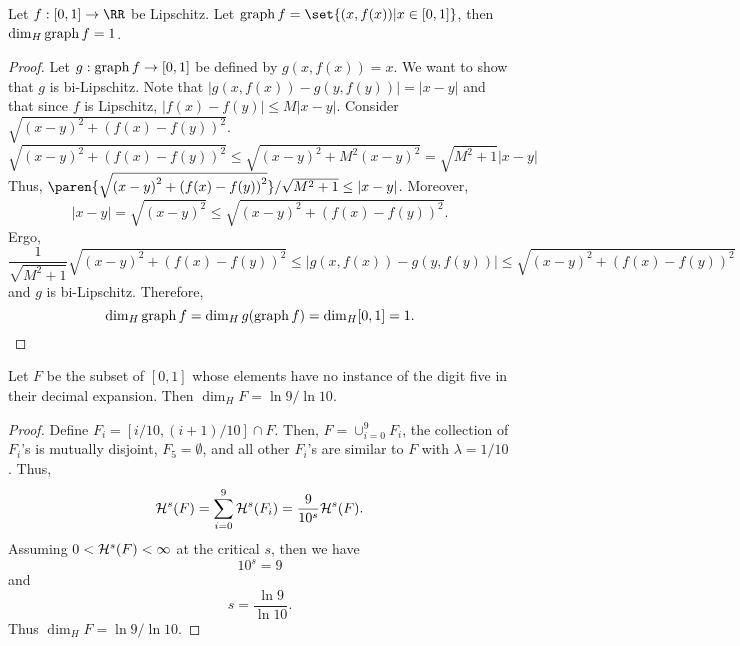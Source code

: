 \begin{example}
	Let $f:[0,1]\rightarrow\RR$ be Lipschitz.
	Let $\gra f=\set{(x,f(x))|x\in[0,1]}$, then $\operatorname{dim}_H \operatorname{graph} f =1$.
\end{example}
\begin{proof}
	Let $g:\operatorname{graph} f\rightarrow [0,1]$ be defined by $g(x,f(x))=x$.
	We want to show that $g$ is bi-Lipschitz.
	Note that $|g(x,f(x))-g(y,f(y))|=|x-y|$ and that since $f$ is Lipschitz, $|f(x)-f(y)|\leq M|x-y|$.
	Consider $\sqrt{{(x-y)}^2+{(f(x)-f(y))}^2}$.
	\[
		\sqrt{{(x-y)}^2+{(f(x)-f(y))}^2}
		\leq \sqrt{{(x-y)}^2+M^2{(x-y)}^2}
		=\sqrt{M^2+1}|x-y|
	\]
	Thus, $\paren{\sqrt{{(x-y)}^2+{(f(x)-f(y))}^2}}/\sqrt{M^2+1}\leq|x-y|$.
	Moreover,
	\[
		|x-y|=\sqrt{{(x-y)}^2}\leq\sqrt{{(x-y)}^2+{(f(x)-f(y))}^2}.
	\]
	Ergo,
	\[
		\frac{1}{\sqrt{M^2+1}}\sqrt{{(x-y)}^2+{(f(x)-f(y))}^2}
		\leq |g(x,f(x))-g(y,f(y))|
		\leq \sqrt{{(x-y)}^2+{(f(x)-f(y))}^2}
	\]
	and $g$ is bi-Lipschitz.
	Therefore,
	\[
		\operatorname{dim}_H \operatorname{graph} f = \operatorname{dim}_H g(\operatorname{graph} f) = \operatorname{dim}_H [0,1] = 1.
	\]
\end{proof}

\begin{example}
	Let $F$ be the subset of $[0,1]$ whose elements have no instance of the digit five in their decimal expansion.
	Then $\dim_H F=\ln 9/\ln 10$.
\end{example}
\begin{proof}
	Define $F_i=[i/10,(i+1)/10]\cap F$.
	Then, $F=\cup_{i=0}^9 F_i$, the collection of $F_i$'s is mutually disjoint, $F_5=\emptyset$, and all other $F_i$'s are similar to $F$ with $\lambda=1/10$.
	Thus,
	\[
		\mathcal{H}^s(F)=\sum_{i=0}^9 \mathcal{H}^s(F_i)=\frac{9}{10^s}\mathcal{H}^s(F).
	\]
	Assuming $0 < \mathcal{H}^s(F) < \infty$ at the critical $s$, then we have
	\[
		10^s=9
	\]
	and
	\[
		s=\frac{\ln9}{\ln10}.
	\]
	Thus $\dim_H F=\ln 9 /\ln 10$.
\end{proof}
